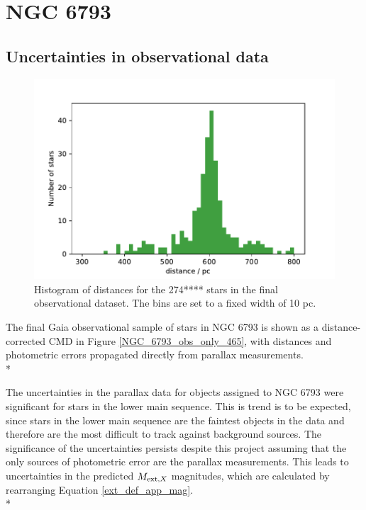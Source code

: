 \documentclass[12pt, a4paper]{report}
\begin{document}
\section{NGC 6793} \label{ngc6793_res_disc}
\subsection{Uncertainties in observational data}

\begin{figure}[h!]
\begin{center}
\includegraphics[width=1.0\textwidth]{../NGC_6793_distances_hist.pdf}
\caption{Histogram of distances for the 274**** stars in the final observational dataset. The bins are set to a fixed width of 10 pc.}
\label{NGC_6793_dist_hist}
\end{center}
\end{figure}

The final Gaia observational sample of stars in NGC 6793 is shown as a distance-corrected CMD in Figure \ref{NGC_6793_obs_only_465}, with distances and photometric errors propagated directly from parallax measurements.\\*

The uncertainties in the parallax data for objects assigned to NGC 6793 were significant for stars in the lower main sequence. This is trend is to be expected, since stars in the lower main sequence are the faintest objects in the data and therefore are the most difficult to track against background sources. The significance of the uncertainties persists despite this project assuming that the only sources of photometric error are the parallax measurements. This leads to uncertainties in the predicted $M_{\textnormal{ext},X}$ magnitudes, which are calculated by rearranging Equation \ref{ext_def_app_mag}.\\*
\end{document}
